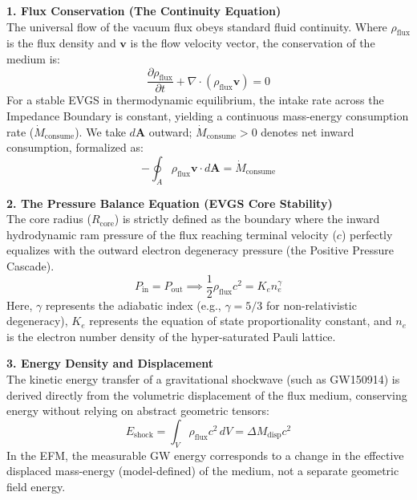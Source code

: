 \documentclass[11pt, a4paper]{article}
\begin{document}
\textbf{1. Flux Conservation (The Continuity Equation)}\\
The universal flow of the vacuum flux obeys standard fluid continuity. Where $\rho_{\text{flux}}$ is the flux density and $\mathbf{v}$ is the flow velocity vector, the conservation of the medium is:
\begin{equation} \label{eq:continuity}
  \frac{\partial \rho_{\text{flux}}}{\partial t} + \nabla \cdot (\rho_{\text{flux}} \mathbf{v}) = 0
\end{equation}
For a stable EVGS in thermodynamic equilibrium, the intake rate across the Impedance Boundary is constant, yielding a continuous mass-energy consumption rate ($\dot{M}_{\text{consume}}$). We take $d\mathbf{A}$ outward; $\dot{M}_{\text{consume}} > 0$ denotes net inward consumption, formalized as:
\begin{equation} \label{eq:massflux}
  -\oint_{A} \rho_{\text{flux}} \mathbf{v} \cdot d\mathbf{A} = \dot{M}_{\text{consume}}
\end{equation}

\textbf{2. The Pressure Balance Equation (EVGS Core Stability)}\\
The core radius ($R_{\text{core}}$) is strictly defined as the boundary where the inward hydrodynamic ram pressure of the flux reaching terminal velocity ($c$) perfectly equalizes with the outward electron degeneracy pressure (the Positive Pressure Cascade).
\begin{equation} \label{eq:pressurebalance}
  P_{\text{in}} = P_{\text{out}} \implies \frac{1}{2} \rho_{\text{flux}} c^2 = K_e n_e^{\gamma}
\end{equation}
Here, $\gamma$ represents the adiabatic index (e.g., $\gamma = 5/3$ for non-relativistic degeneracy), $K_e$ represents the equation of state proportionality constant, and $n_e$ is the electron number density of the hyper-saturated Pauli lattice.

\textbf{3. Energy Density and Displacement}\\
The kinetic energy transfer of a gravitational shockwave (such as GW150914) is derived directly from the volumetric displacement of the flux medium, conserving energy without relying on abstract geometric tensors:
\begin{equation} \label{eq:shockenergy}
  E_{\text{shock}} = \int_{V} \rho_{\text{flux}} c^2 \, dV = \Delta M_{\text{disp}} c^2
\end{equation}
In the EFM, the measurable GW energy corresponds to a change in the effective displaced mass-energy (model-defined) of the medium, not a separate geometric field energy.
\end{document}
